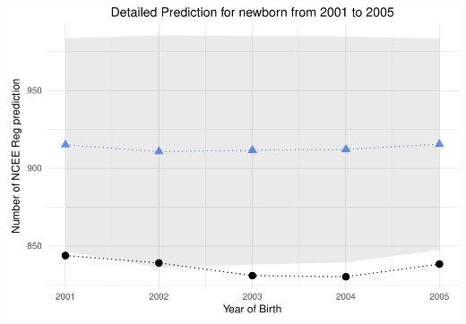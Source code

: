 \documentclass[]{article}
\begin{document}
\includegraphics{NCEE_files/figure-latex/unnamed-chunk-6-2.pdf}
\end{document}

